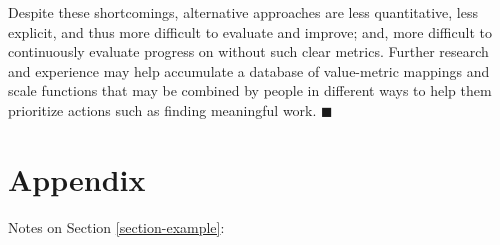 \documentclass[10pt, a4paper, twocolumn]{IEEEconf}
\begin{document}
Despite these shortcomings, alternative approaches are less quantitative, less explicit, and thus more difficult to evaluate and improve; and, more difficult to continuously evaluate progress on without such clear metrics. Further research and experience may help accumulate a database of value-metric mappings and scale functions that may be combined by people in different ways to help them prioritize actions such as finding meaningful work. $\blacksquare$




\newpage
\clearpage

\section{Appendix}

Notes on Section \ref{section-example}:
\end{document}
